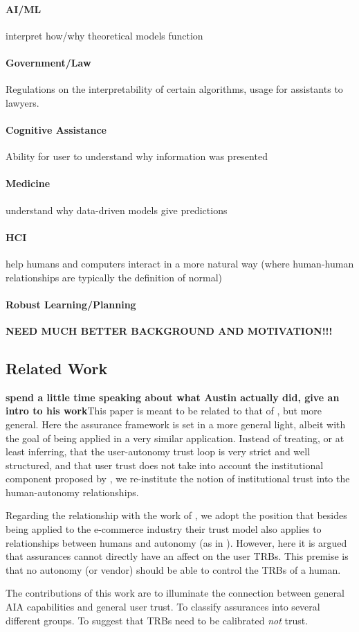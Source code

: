     \paragraph{AI/ML} interpret how/why theoretical models function
    \paragraph{Government/Law} Regulations on the interpretability of certain algorithms, usage for assistants to lawyers.
    \paragraph{Cognitive Assistance} Ability for user to understand why information was presented
    \paragraph{Medicine} understand why data-driven models give predictions
    \paragraph{HCI} help humans and computers interact in a more natural way (where human-human relationships are typically the definition of normal)
    \paragraph{Robust Learning/Planning}
    
    \textbf{NEED MUCH BETTER BACKGROUND AND MOTIVATION!!!}

\subsection{Related Work}
    \textbf{spend a little time speaking about what Austin actually did, give an intro to his work}This paper is meant to be related to that of \citet{Lillard2016-yg}, but more general. Here the assurance framework is set in a more general light, albeit with the goal of being applied in a very similar application. Instead of treating, or at least inferring, that the user-autonomy trust loop is very strict and well structured, and that user trust does not take into account the institutional component proposed by \citet{McKnight2001-fa}, we re-institute the notion of institutional trust into the human-autonomy relationships.

    Regarding the relationship with the work of \citet{McKnight2001-fa}, we adopt the position that besides being applied to the e-commerce industry their trust model also applies to relationships between humans and autonomy (as in \citet{Lillard2016-yg}). However, here it is argued that assurances cannot directly have an affect on the user TRBs. This premise is that no autonomy (or vendor) should be able to control the TRBs of a human.

    The contributions of this work are to illuminate the connection between general AIA capabilities and general user trust. To classify assurances into several different groups. To suggest that TRBs need to be calibrated \emph{not} trust.







